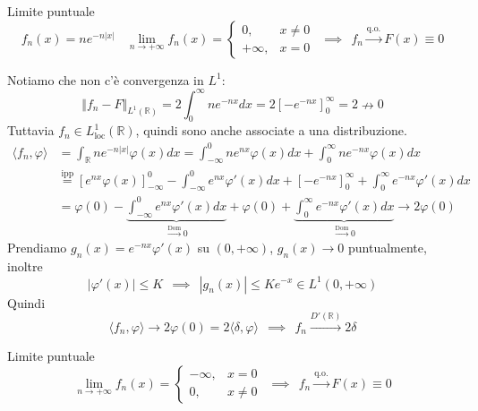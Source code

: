 Limite puntuale
\begin{equation*}
f_{n} (x)=ne^{-n|x|} \ \ \ \ \lim\limits _{n\rightarrow +\infty } f_{n}( x) =\begin{cases}
0, & x\neq 0\\
+\infty , & x=0
\end{cases} \ \ \implies \ \ f_{n}\xrightarrow{\text{q.o.}} F( x) \equiv 0
\end{equation*}

Notiamo che non c'è convergenza in $L^{1}$:
\begin{equation*}
\Vert f_{n} -F\Vert _{L^{1}(\mathbb{R})} =2\int ^{\infty }_{0} ne^{-nx} dx=2\left[ -e^{-nx}\right]^{\infty }_{0} =2\nrightarrow 0
\end{equation*}
Tuttavia $f_{n} \in L^{1}_{\mathrm{loc}}(\mathbb{R})$, quindi sono anche associate a una distribuzione.
\begin{equation*}
\begin{aligned}
\langle f_{n} ,\varphi \rangle  & =\int _{\mathbb{R}} ne^{-n| x| } \varphi ( x) dx=\int ^{0}_{-\infty } ne^{nx} \varphi ( x) dx+\int ^{\infty }_{0} ne^{-nx} \varphi ( x) dx\\
 & \overset{\text{ipp}}{=}\left[ e^{nx} \varphi ( x)\right]^{0}_{-\infty } -\int ^{0}_{-\infty } e^{nx} \varphi '( x) dx+\left[ -e^{-nx}\right]^{\infty }_{0} +\int ^{\infty }_{0} e^{-nx} \varphi '( x) dx\\
 & =\varphi ( 0) -\underbrace{\int ^{0}_{-\infty } e^{nx} \varphi '( x) dx}_{\xrightarrow{\text{Dom}} 0} +\varphi ( 0) +\underbrace{\int ^{\infty }_{0} e^{-nx} \varphi '( x) dx}_{\xrightarrow{\text{Dom}} 0}\rightarrow 2\varphi ( 0)
\end{aligned}
\end{equation*}
Prendiamo $g_{n}( x) =e^{-nx} \varphi '( x)$ su $( 0,+\infty )$, $g_{n}( x)\rightarrow 0$ puntualmente, inoltre
\begin{equation*}
| \varphi '( x)| \leqslant K\ \ \implies \ \ | g_{n}( x)| \leqslant Ke^{-x} \in L^{1}( 0,+\infty )
\end{equation*}
Quindi
\begin{equation*}
\langle f_{n} ,\varphi \rangle \rightarrow 2\varphi ( 0) =2\langle \delta ,\varphi \rangle \ \ \implies \ \ f_{n}\xrightarrow{D'(\mathbb{R})} 2\delta 
\end{equation*}
\Soluzione

Limite puntuale
\begin{equation*}
\lim\limits _{n\rightarrow +\infty } f_{n}( x) =\begin{cases}
-\infty , & x=0\\
0, & x\neq 0
\end{cases} \ \ \implies \ \ f_{n}\xrightarrow{\text{q.o.}} F( x) \equiv 0
\end{equation*}

